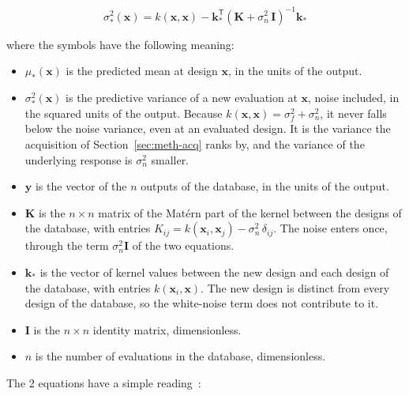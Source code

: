 \begin{equation}
\sigma_*^{2}(\mathbf{x})
= k(\mathbf{x}, \mathbf{x})
- \mathbf{k}_*^{\mathsf T}
\left( \mathbf{K} + \sigma_n^{2}\,\mathbf{I} \right)^{-1} \mathbf{k}_*
\label{eq:gp-var}
\end{equation}

\noindent where the symbols have the following meaning:

\begin{itemize}
  \item $\mu_*(\mathbf{x})$ is the predicted mean at design
        $\mathbf{x}$, in the units of the output.

  \item $\sigma_*^{2}(\mathbf{x})$ is the predictive variance of a new
        evaluation at $\mathbf{x}$, noise included, in the squared units
        of the output. Because $k(\mathbf{x}, \mathbf{x}) =
        \sigma_f^{2} + \sigma_n^{2}$, it never falls below the noise
        variance, even at an evaluated design. It is the variance the
        acquisition of Section~\ref{sec:meth-acq} ranks by, and the
        variance of the underlying response is $\sigma_n^{2}$ smaller.

  \item $\mathbf{y}$ is the vector of the $n$ outputs of the database, in the
        units of the output.

  \item $\mathbf{K}$ is the $n \times n$ matrix of the Mat\'ern part of
        the kernel between the designs of the database, with entries
        $K_{ij} = k(\mathbf{x}_i, \mathbf{x}_j) - \sigma_n^{2}\,
        \delta_{ij}$. The noise enters once, through the term
        $\sigma_n^{2}\mathbf{I}$ of the two equations.

  \item $\mathbf{k}_*$ is the vector of kernel values between the new
        design and each design of the database, with entries
        $k(\mathbf{x}_i, \mathbf{x})$. The new design is distinct from
        every design of the database, so the white-noise term does not
        contribute to it.

  \item $\mathbf{I}$ is the $n \times n$ identity matrix,
        dimensionless.

  \item $n$ is the number of evaluations in the database, dimensionless.
\end{itemize}

The 2 equations have a simple reading~\cite{rasmussen_gp_2006}:

